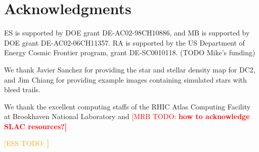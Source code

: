 \documentclass[iop, twocolappendix, appendixfloats, numberedappendix, apj]{hackemulateapj}
\newcommand{\mattodo}[1]{\textcolor{red}{[MRB TODO: \bf #1]}}
\newcommand{\esstodo}[1]{\textcolor{orange}{[ESS TODO: \bf #1]}}
\begin{document}
%
%
%
%



\section*{Acknowledgments}

ES is supported by DOE grant DE-AC02-98CH10886, and MB is supported by DOE
grant DE-AC02-06CH11357.  RA is supported by the US Department of Energy Cosmic
Frontier program, grant DE-SC0010118.  (TODO Mike's funding)

We thank Javier Sanchez for providing the star and stellar density map for DC2,
and Jim Chiang for providing example images containing simulated stars
with bleed trails.

We thank the excellent computing staffs of the RHIC Atlas Computing Facility at
Brookhaven National Laboratory and \mattodo{how to acknowledge SLAC resources?}

\esstodo{}


%
%
%
%


\end{document}
